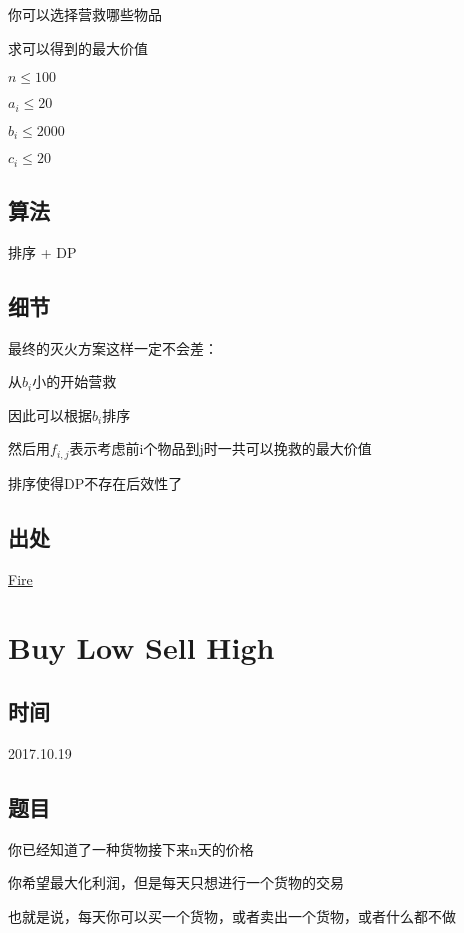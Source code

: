 \documentclass[a4paper]{article}
\begin{document}
		你可以选择营救哪些物品
		
		求可以得到的最大价值
		
		$n \leq 100$
		
		$a_i \leq 20$
		
		$b_i \leq 2000$
		
		$c_i \leq 20$
		
	\subsection{算法}
		
		排序 + DP
		
	\subsection{细节}
		
		最终的灭火方案这样一定不会差：
		
		从$b_i$小的开始营救
		
		因此可以根据$b_i$排序
		
		然后用$f_{i,j}$表示考虑前i个物品到j时一共可以挽救的最大价值
		
		排序使得DP不存在后效性了
		
	\subsection{出处}
		
		\href {http://codeforces.com/problemset/problem/864/E}{Fire}
		
	\newpage
	
	\section{Buy Low Sell High}
		
	\subsection{时间}
	
		2017.10.19
		
	\subsection{题目}
		
		你已经知道了一种货物接下来$\text{n}$天的价格
		
		你希望最大化利润，但是每天只想进行一个货物的交易
		
		也就是说，每天你可以买一个货物，或者卖出一个货物，或者什么都不做
	
\end{document}
